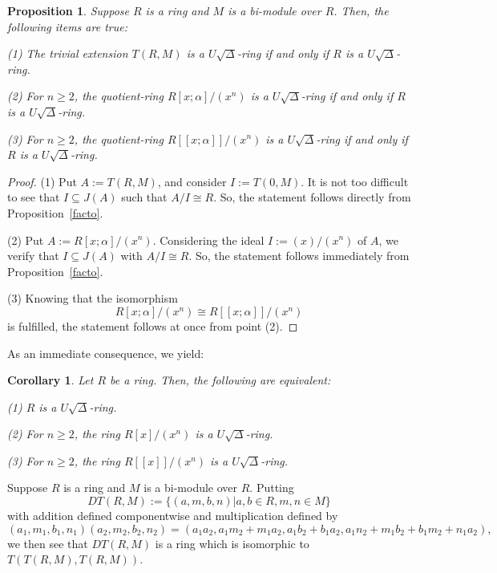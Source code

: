 \documentclass[11pt]{amsart}
\newtheorem{proposition}[theorem]{Proposition}
\newtheorem{corollary}[theorem]{Corollary}
\theoremstyle{definition}
\begin{document}
\begin{proposition}\label{4.5}
Suppose $R$ is a ring and $M$ is a bi-module over $R$. Then, the following items are true:
	
(1) The trivial extension $T(R, M)$ is a $U\sqrt{\Delta}$-ring if and only if $R$ is a $U\sqrt{\Delta}$-ring.
	
(2) For $n \geq 2$, the quotient-ring $R[x; \alpha]/(x^n)$ is a $U\sqrt{\Delta}$-ring if and only if $R$ is a $U\sqrt{\Delta}$-ring.
	
(3) For $n \geq 2$, the quotient-ring $R[[x; \alpha]]/(x^n)$ is a $U\sqrt{\Delta}$-ring if and only if $R$ is a $U\sqrt{\Delta}$-ring.
\end{proposition}

\begin{proof}
(1) Put $A:=T(R, M)$, and consider $I:=T(0, M)$. It is not too difficult to see that $I\subseteq J(A)$ such that $A/I \cong R$. So, the statement follows directly from Proposition~\ref{facto}.
	
(2) Put $A:=R[x; \alpha]/(x^n)$. Considering the ideal $I:=(x)/(x^n)$ of $A$, we verify that $I\subseteq J(A)$ with $A/I \cong R$. So, the statement follows immediately from Proposition~\ref{facto}.
	
(3) Knowing that the isomorphism $$R[x; \alpha]/(x^n) \cong R[[x; \alpha]]/(x^n)$$ is fulfilled, the statement follows at once from point (2).
\end{proof}

As an immediate consequence, we yield:

\begin{corollary}\label{4.6}
Let $R$ be a ring. Then, the following are equivalent:
	
(1) $R$ is a $U\sqrt{\Delta}$-ring.
	
(2) For $n \geq 2$, the ring $R[x]/(x^n)$ is a $U\sqrt{\Delta}$-ring.
	
(3) For $n \geq 2$, the ring $R[[x]]/(x^n)$ is a $U\sqrt{\Delta}$-ring.
\end{corollary}

Suppose $R$ is a ring and $M$ is a bi-module over $R$. Putting $$DT(R,M) := \{ (a, m, b, n) | a, b \in R, m, n \in M \}$$ with addition defined componentwise and multiplication defined by $$(a_1, m_1, b_1, n_1)(a_2, m_2, b_2, n_2) = (a_1a_2, a_1m_2 + m_1a_2, a_1b_2 + b_1a_2, a_1n_2 + m_1b_2 + b_1m_2 +n_1a_2),$$ we then see that $DT(R,M)$ is a ring which is isomorphic to $T(T(R, M),  T(R, M))$.
\end{document}
